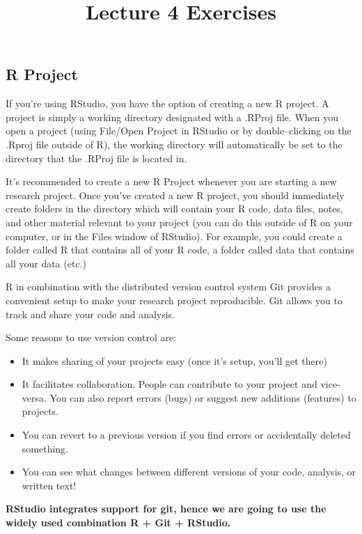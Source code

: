 \documentclass[
  letterpaper,
  DIV=11,
  numbers=noendperiod]{scrartcl}
\title{Lecture 4 Exercises}
\author{}
\date{}
\begin{document}
\maketitle

\hypertarget{r-project}{%
\subsection{R Project}\label{r-project}}

If you're using RStudio, you have the option of creating a new R
project. A project is simply a working directory designated with a
.RProj file. When you open a project (using File/Open Project in RStudio
or by double--clicking on the .Rproj file outside of R), the working
directory will automatically be set to the directory that the .RProj
file is located in.

It's recommended to create a new R Project whenever you are starting a
new research project. Once you've created a new R project, you should
immediately create folders in the directory which will contain your R
code, data files, notes, and other material relevant to your project
(you can do this outside of R on your computer, or in the Files window
of RStudio). For example, you could create a folder called R that
contains all of your R code, a folder called data that contains all your
data (etc.)

R in combination with the distributed version control system Git
provides a convenient setup to make your research project reproducible.
Git allows you to track and share your code and analysis.

Some reasons to use version control are:

\begin{itemize}
\item
  It makes sharing of your projects easy (once it's setup, you'll get
  there)
\item
  It facilitates collaboration. People can contribute to your project
  and vice-versa. You can also report errors (bugs) or suggest new
  additions (features) to projects.
\item
  You can revert to a previous version if you find errors or
  accidentally deleted something.
\item
  You can see what changes between different versions of your code,
  analysis, or written text!
\end{itemize}

\textbf{RStudio integrates support for git, hence we are going to use
the widely used combination R + Git + RStudio.}
\end{document}
